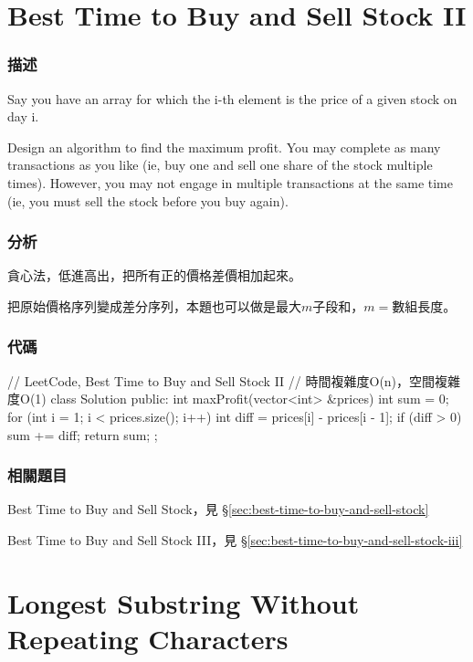\section{Best Time to Buy and Sell Stock II} %
\label{sec:best-time-to-buy-and-sell-stock-ii}


\subsubsection{描述}
Say you have an array for which the i-th element is the price of a given stock on day i.

Design an algorithm to find the maximum profit. You may complete as many transactions as you like (ie, buy one and sell one share of the stock multiple times). However, you may not engage in multiple transactions at the same time (ie, you must sell the stock before you buy again).


\subsubsection{分析}
貪心法，低進高出，把所有正的價格差價相加起來。

把原始價格序列變成差分序列，本題也可以做是最大$m$子段和，$m=$數組長度。

\subsubsection{代碼}
\begin{Code}
// LeetCode, Best Time to Buy and Sell Stock II
// 時間複雜度O(n)，空間複雜度O(1)
class Solution {
public:
    int maxProfit(vector<int> &prices) {
        int sum = 0;
        for (int i = 1; i < prices.size(); i++) {
            int diff = prices[i] - prices[i - 1];
            if (diff > 0) sum += diff;
        }
        return sum;
    }
};
\end{Code}


\subsubsection{相關題目}
\begindot
\item Best Time to Buy and Sell Stock，見 \S \ref{sec:best-time-to-buy-and-sell-stock}
\item Best Time to Buy and Sell Stock III，見 \S \ref{sec:best-time-to-buy-and-sell-stock-iii}
\myenddot


\section{Longest Substring Without Repeating Characters} %
\label{sec:longest-substring-without-repeating-characters}


